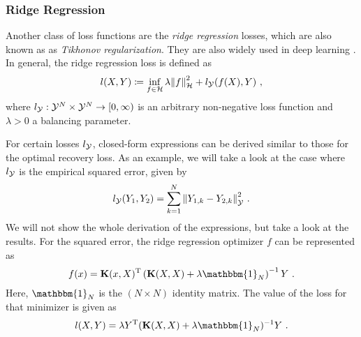 \subsubsection{Ridge Regression}

Another class of loss functions are the \emph{ridge regression} losses, which are also known as as \emph{Tikhonov regularization}.
They are also widely used in deep learning \cite{goodfellow16}.
In general, the ridge regression loss is defined as
\begin{equation}
	\label{eq:ridge-regression-loss}
	l(X, Y) \coloneqq \inf_{f \in \mathcal{H}} \lambda \norm{f}_\mathcal{H}^2 
	+ l_{\mathcal{Y}} (f(X), Y) \ ,
\end{equation}
where $l_{\mathcal{Y}}: \mathcal{Y}^N \times \mathcal{Y}^N \rightarrow [0, \infty)$ is an arbitrary non-negative loss function and $\lambda > 0$ a balancing parameter.

For certain losses $l_{\mathcal{Y}}$, closed-form expressions can be derived similar to those for the optimal recovery loss.
As an example, we will take a look at the case where $l_{\mathcal{Y}}$ is the empirical squared error, given by
\begin{equation}
	l_{\mathcal{Y}}(Y_1, Y_2) = \sum_{k=1}^{N} \norm{Y_{1, k} - Y_{2, k}}_{\mathcal{Y}}^2 \ .
\end{equation}
We will not show the whole derivation of the expressions, but take a look at the results.
For the squared error, the ridge regression optimizer $f$ can be represented as
\begin{equation}
	\label{eq:ridge-regression-f}
	f(x) = \mathbf{K}(x, X)^\T \left(\mathbf{K}(X, X) + \lambda \mathbbm{1}_N \right)^{-1}Y \ .
\end{equation}
Here, $\mathbbm{1}_N$ is the $(N\times N)$ identity matrix.
The value of the loss for that minimizer is given as
\begin{equation}
	\label{eq:ridge-regression-loss-se-closed-form}
	l(X, Y) = \lambda Y^\T (\mathbf{K}(X, X) + \lambda \mathbbm{1}_N)^{-1} Y \ .
\end{equation}